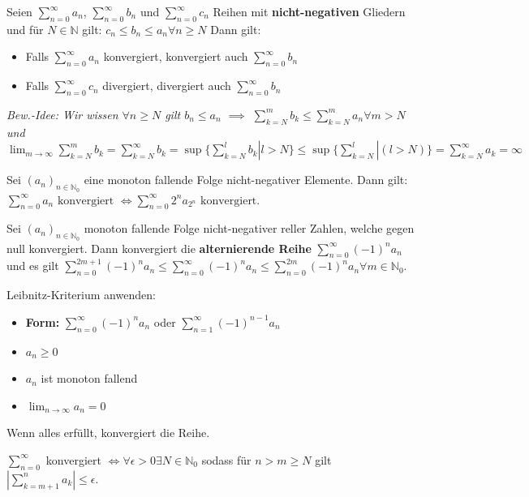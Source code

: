  Seien $\sum_{n=0}^{\infty} a_n$, $\sum_{n=0}^{\infty} b_n$ und $\sum_{n=0}^{\infty} c_n$ Reihen mit \textbf{nicht-negativen} Gliedern und für $N \in \mathbb{N}$ gilt: $c_n \leq b_n \leq a_n \forall n \geq N$
Dann gilt:
\begin{itemize}
    \item Falls $\sum_{n=0}^{\infty} a_n$ konvergiert, konvergiert auch $\sum_{n=0}^{\infty} b_n$ 
    \item Falls $\sum_{n=0}^{\infty} c_n$ divergiert, divergiert auch $\sum_{n=0}^{\infty} b_n$ 
\end{itemize}

\textit{Bew.-Idee: Wir wissen $\forall n \geq N$ gilt $b_n \leq a_n$ $\implies$ $\sum_{k=N}^{m} b_k \leq \sum_{k=N}^{m} a_n \forall m > N$ und $\lim_{m \rightarrow \infty} \sum_{k=N}^{m} b_k = \sum_{k=N}^{\infty} b_k = \sup \{ \sum_{k=N}^{l} b_k | l > N\} \leq \sup \{\sum_{k=N}^{l} | (l>N)\} = \sum_{k=N}^{\infty} a_k = \infty$}

{\color{gray}
 Sei $(a_n)_{n \in \mathbb{N}_0}$ eine monoton fallende Folge nicht-negativer Elemente. Dann gilt:
$\sum_{n=0}^{\infty}a_n \text{ konvergiert }\iff\sum_{n=0}^{\infty}2^na_{2^n}\text{ konvergiert}$.
}

 Sei $(a_n)_{n \in \mathbb{N}_0}$ monoton fallende Folge nicht-negativer reller Zahlen, welche gegen null konvergiert. Dann konvergiert die \textbf{alternierende Reihe} $\sum_{n=0}^{\infty} (-1)^n a_n$ und es gilt $\sum_{n=0}^{2m+1}(-1)^na_n \leq \sum_{n=0}^{\infty}(-1)^n a_n \leq \sum_{n=0}^{2m} (-1)^n a_n \forall m \in \mathbb{N}_0$.

\begin{exercise}
    Leibnitz-Kriterium anwenden:

    \begin{itemize}
        \item \textbf{Form:} $\sum_{n=0}^{\infty} (-1)^n a_n$ oder $\sum_{n=1}^{\infty} (-1)^{n-1}a_n$
        \item $a_n \geq 0$
        \item $a_n$ ist monoton fallend
        \item $\lim_{n\rightarrow\infty} a_n = 0$
    \end{itemize}
    Wenn alles erfüllt, konvergiert die Reihe.
\end{exercise}

 $\sum_{n=0}^{\infty}$ konvergiert $\iff \forall \epsilon >0 \exists N \in \mathbb{N}_0$ sodass für $n>m\geq N$ gilt $|\sum_{k=m+1}^{n}a_k|\leq \epsilon$.

